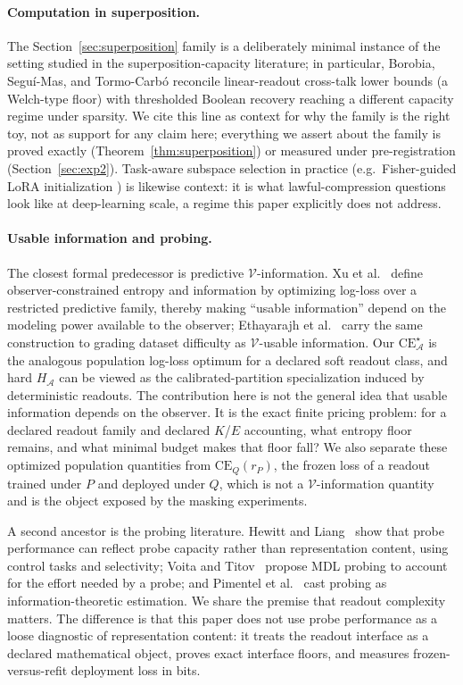 \documentclass[twocolumn,10pt]{article}
\theoremstyle{definition}
\theoremstyle{remark}
\newcommand{\cA}{\mathcal{A}}
\newcommand{\CE}{\mathrm{CE}}
\newcommand{\CEQ}[1]{\CE_{Q}({#1})}
\newcommand{\rP}{r_{P}}
\begin{document}
\paragraph{Computation in superposition.}
The Section~\ref{sec:superposition} family is a deliberately minimal
instance of the setting studied in the superposition-capacity literature;
in particular, Borobia, Segu\'i-Mas, and Tormo-Carb\'o
\cite{borobia2026linear} reconcile linear-readout cross-talk lower bounds
(a Welch-type floor) with thresholded Boolean recovery reaching a
different capacity regime under sparsity. We cite this line as context
for why the family is the right toy, not as support for any claim here;
everything we assert about the family is proved exactly
(Theorem~\ref{thm:superposition}) or measured under pre-registration
(Section~\ref{sec:exp2}). Task-aware subspace selection in practice
(e.g.\ Fisher-guided LoRA initialization \cite{fisherlora}) is likewise
context: it is what lawful-compression questions look like at deep-learning
scale, a regime this paper explicitly does not address.

\paragraph{Usable information and probing.}
The closest formal predecessor is predictive
$\mathcal{V}$-information. Xu et al.~\cite{xuvinfo} define
observer-constrained entropy and information by optimizing log-loss
over a restricted predictive family, thereby making ``usable
information'' depend on the modeling power available to the observer;
Ethayarajh et al.~\cite{ethayarajhvinfo} carry the same construction
to grading dataset difficulty as $\mathcal{V}$-usable information. Our
$\CE^{\star}_{\cA}$ is the analogous population log-loss optimum for a
declared soft readout class, and hard $H_{\cA}$ can be viewed as the
calibrated-partition specialization induced by deterministic readouts.
The contribution here is not the general idea that usable information
depends on the observer. It is the exact finite pricing problem: for a
declared readout family and declared $K$/$E$ accounting, what entropy
floor remains, and what minimal budget makes that floor fall? We also
separate these optimized population quantities from $\CEQ{\rP}$, the
frozen loss of a readout trained under $P$ and deployed under $Q$,
which is not a $\mathcal{V}$-information quantity and is the object
exposed by the masking experiments.

A second ancestor is the probing literature. Hewitt and
Liang~\cite{hewittliang} show that probe performance can reflect probe
capacity rather than representation content, using control tasks and
selectivity; Voita and Titov~\cite{voitatitov} propose MDL probing to
account for the effort needed by a probe; and Pimentel et
al.~\cite{pimentelprobing} cast probing as information-theoretic
estimation. We share the premise that readout complexity matters. The
difference is that this paper does not use probe performance as a
loose diagnostic of representation content: it treats the readout
interface as a declared mathematical object, proves exact interface
floors, and measures frozen-versus-refit deployment loss in bits.
\end{document}
